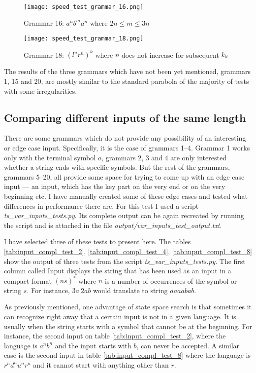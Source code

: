 \begin{figure}[h!]
  \texttt{[image: speed\_test\_grammar\_16.png]}
  \caption{Grammar 16: $a^n b^m a^n$ where $2n \leq m \leq 3n$}
  \label{fig:speed_test_grammar_16}
\end{figure}

\begin{figure}[h!]
  \texttt{[image: speed\_test\_grammar\_18.png]}
  \caption{Grammar 18: $(l^n r^n)^k$ where $n$ does not increase for subsequent $k$s}
  \label{fig:speed_test_grammar_18}
\end{figure}

The results of the three grammars which have not been yet mentioned, grammars 1, 15 and 20, are mostly similar to the standard parabola of the majority of tests with some irregularities.

\subsection{Comparing different inputs of the same length}
There are some grammars which do not provide any possibility of an interesting or edge case input. Specifically, it is the case of grammars 1--4. Grammar 1 works only with the terminal symbol $a$, grammars 2, 3 and 4 are only interested whether a string ends with specific symbols. But the rest of the grammars, grammars 5--20, all provide some space for trying to come up with an edge case input --- an input, which has the key part on the very end or on the very beginning etc. I have manually created some of these edge cases and tested what differences in performance there are. For this test I used a script \textit{ts\_var\_inputs\_tests.py}. Its complete output can be again recreated by running the script and is attached in the file \textit{output/var\_inputs\_test\_output.txt}.

I have selected three of these tests to present here. The tables \ref{tab:input_compl_test_2}, \ref{tab:input_compl_test_4}, \ref{tab:input_compl_test_8}  show the output of three tests from the script \textit{ts\_var\_inputs\_tests.py}. The first column called Input displays the string that has been used as an input in a compact format $(ns)^*$ where $n$ is a number of occurrences of the symbol or string $s$. For instance, $3a\:2ab$ would translate to string $aaaabab$.

As previously mentioned, one advantage of state space search is that sometimes it can recognize right away that a certain input is not in a given language. It is usually when the string starts with a symbol that cannot be at the beginning. For instance, the second input on table \ref{tab:input_compl_test_2}, where the language is $a^nb^n$ and the input starts with $b$, can never be accepted. A similar case is the second input in table \ref{tab:input_compl_test_8} where the language is $r^nd^nu^nr^n$ and it cannot start with anything other than $r$.

